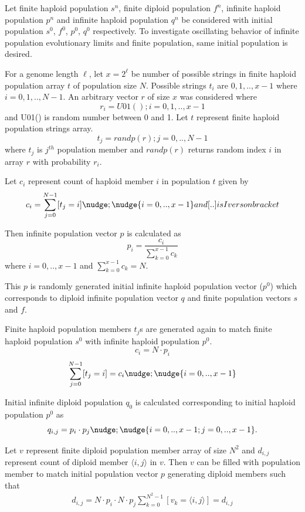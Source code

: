 Let finite haploid population $s^n$, finite diploid population $f^n$, infinite haploid population $p^n$ and infinite haploid population $q^n$ be considered with initial population $s^0$, $f^0$,
$p^0$, $q^0$ respectively. To investigate oscillating behavior of infinite population evolutionary limits and finite population, same initial population is desired. 

For a genome length $\ell$, let $x = 2^\ell$ be number of possible strings in finite haploid population array $t$ of population size $N$. Possible strings $t_i$ are ${0, 1,.., x-1}$ where $i = 0, 1,.., N-1$. An arbitrary vector $r$ of size $x$ was considered where
\[
r_i = U01(); {i = 0, 1,.., x-1}
\]
and U01() is random number between 0 and 1.
Let $t$ represent finite haploid population strings array.
\[
t_j = randp(r) ; {j = 0,.., N-1}
\]
where $t_j$ is $j^{th}$ population member and $randp(r)$ returns random index $i$ in array $r$ with probability $r_i$.

Let $c_i$ represent count of haploid member $i$ in population $t$ given by
\[
c_i = \sum \limits_{j=0}^{N-1} [t_j = i]  \nudge; \nudge {i = 0,.., x-1}  and  [..]  is  Iverson bracket
\]

Then infinite population vector $p$ is calculated as
\[
p_i = \frac{c_i}{ \sum \limits_{k=0}^{x-1} c_k }
\]
where $i = 0,.., x-1$ and $\sum \limits_{k=0}^{x-1} c_k = N$.

This $p$ is randomly generated initial infinite haploid population vector ($p^0$) which corresponds to diploid infinite population vector $q$ 
and finite population vectors $s$ and $f$.

Finite haploid population members $t_j$s are generated again to match finite haploid population $s^0$ with infinite haploid population $p^0$.
\[
c_i = N \cdot p_i 
\]
\[
\sum \limits_{j=0}^{N-1} [t_j = i] = c_i  \nudge; \nudge {i = 0,.., x-1} 
\]

Initial infinite diploid population $q_0$ is calculated corresponding to initial haploid population $p^0$ as
\[
q_{i,j} = p_i \cdot p_j  \nudge; \nudge {i = 0,..,x-1; j = 0,..,x-1}.
\]

Let $v$ represent finite diploid population member array of size $N^2$ and $d_{i,j}$ represent count of diploid member $\langle i,j \rangle$ in $v$. Then $v$ can be filled with population member to match initial population vector $p$ generating diploid members such that
\begin{eqnarray*}
d_{i,j} = N \cdot p_i \cdot N \cdot p_j 
\sum \limits_{k=0}^{N^2-1} [ v_k = \langle i,j \rangle ] = d_{i,j}
\end{eqnarray*}

